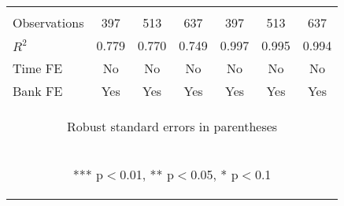 \documentclass[]{article}
\begin{document}
\begin{center}
\begin{tabular}{lcccccc}
\vspace{4pt} & \begin{footnotesize}\end{footnotesize} & \begin{footnotesize}\end{footnotesize} & \begin{footnotesize}\end{footnotesize} & \begin{footnotesize}\end{footnotesize} & \begin{footnotesize}\end{footnotesize} & \begin{footnotesize}\end{footnotesize} \\
Observations & 397 & 513 & 637 & 397 & 513 & 637 \\
$R^2$ & 0.779 & 0.770 & 0.749 & 0.997 & 0.995 & 0.994 \\
Time FE & No & No & No & No & No & No \\
 Bank FE & Yes & Yes & Yes & Yes & Yes & Yes \\ \hline
\multicolumn{7}{c}{\begin{footnotesize} Robust standard errors in parentheses\end{footnotesize}} \\
\multicolumn{7}{c}{\begin{footnotesize} *** p$<$0.01, ** p$<$0.05, * p$<$0.1\end{footnotesize}} \\
\end{tabular}
\end{center}
\end{document}
